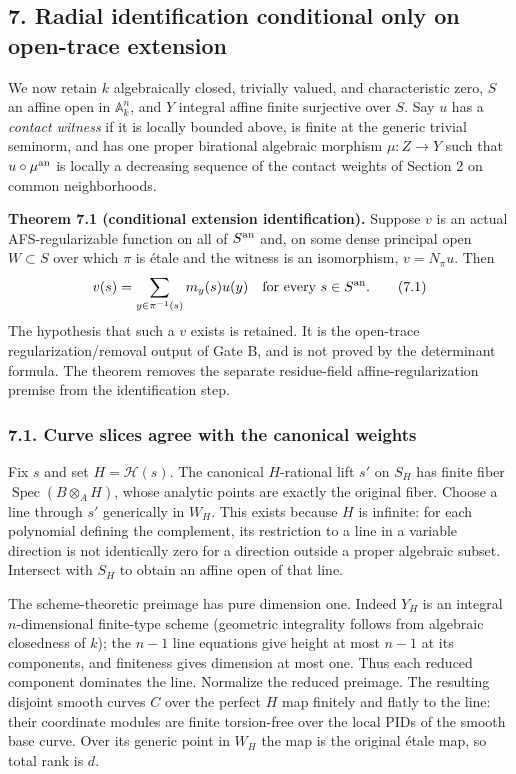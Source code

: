 \documentclass[
  10pt,
]{article}
\begin{document}
\subsection{7. Radial identification conditional only on open-trace
extension}\label{radial-identification-conditional-only-on-open-trace-extension}

We now retain \(k\) algebraically closed, trivially valued, and
characteristic zero, \(S\) an affine open in \(\mathbb A_k^n\), and
\(Y\) integral affine finite surjective over \(S\). Say \(u\) has a
\emph{contact witness} if it is locally bounded above, is finite at the
generic trivial seminorm, and has one proper birational algebraic
morphism \(\mu:Z\to Y\) such that \(u\circ\mu^{\rm an}\) is locally a
decreasing sequence of the contact weights of Section 2 on common
neighborhoods.

\textbf{Theorem 7.1 (conditional extension identification).} Suppose
\(v\) is an actual AFS-regularizable function on all of \(S^{\rm an}\)
and, on some dense principal open \(W\subset S\) over which \(\pi\) is
étale and the witness is an isomorphism, \(v=N_\pi u\). Then
\[v(s)=\sum_{y\in\pi^{-1}(s)}m_y(s)u(y)\quad\text{for every }s\in S^{\rm an}.\tag{7.1}\]
The hypothesis that such a \(v\) exists is retained. It is the
open-trace regularization/removal output of Gate B, and is not proved by
the determinant formula. The theorem removes the separate residue-field
affine-regularization premise from the identification step.

\subsubsection{7.1. Curve slices agree with the canonical
weights}\label{curve-slices-agree-with-the-canonical-weights}

Fix \(s\) and set \(H=\mathcal H(s)\). The canonical \(H\)-rational lift
\(s'\) on \(S_H\) has finite fiber \(\operatorname{Spec}(B\otimes_AH)\),
whose analytic points are exactly the original fiber. Choose a line
through \(s'\) generically in \(W_H\). This exists because \(H\) is
infinite: for each polynomial defining the complement, its restriction
to a line in a variable direction is not identically zero for a
direction outside a proper algebraic subset. Intersect with \(S_H\) to
obtain an affine open of that line.

The scheme-theoretic preimage has pure dimension one. Indeed \(Y_H\) is
an integral \(n\)-dimensional finite-type scheme (geometric integrality
follows from algebraic closedness of \(k\)); the \(n-1\) line equations
give height at most \(n-1\) at its components, and finiteness gives
dimension at most one. Thus each reduced component dominates the line.
Normalize the reduced preimage. The resulting disjoint smooth curves
\(C\) over the perfect \(H\) map finitely and flatly to the line: their
coordinate modules are finite torsion-free over the local PIDs of the
smooth base curve. Over its generic point in \(W_H\) the map is the
original étale map, so total rank is \(d\).
\end{document}
